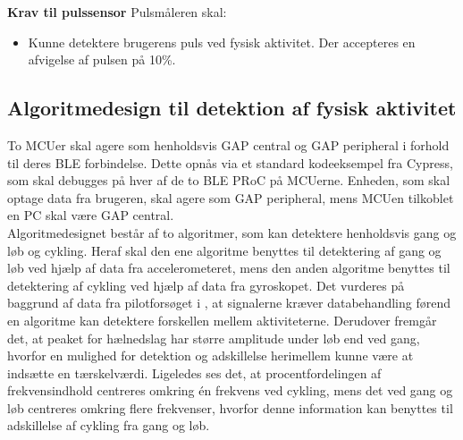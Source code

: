 \textbf{Krav til pulssensor} \newline
Pulsmåleren skal:
\begin{itemize}
\item Kunne detektere brugerens puls ved fysisk aktivitet. Der accepteres en afvigelse af pulsen på 10\%.
\end{itemize}
%

\subsection{Algoritmedesign til detektion af fysisk aktivitet} \label{krav_algoritme}
To MCUer skal agere som henholdsvis GAP central og GAP peripheral i forhold til deres BLE forbindelse. Dette opnås via et standard kodeeksempel fra Cypress, som skal debugges på hver af de to BLE PRoC på MCUerne. Enheden, som skal optage data fra brugeren, skal agere som GAP peripheral, mens MCUen tilkoblet en PC skal være GAP central. \\
Algoritmedesignet består af to algoritmer, som kan detektere henholdsvis gang og løb og cykling. Heraf skal den ene algoritme benyttes til detektering af gang og løb ved hjælp af data fra accelerometeret, mens den anden algoritme benyttes til detektering af cykling ved hjælp af data fra gyroskopet. Det vurderes på baggrund af data fra pilotforsøget i , at signalerne kræver databehandling førend en algoritme kan detektere forskellen mellem aktiviteterne. Derudover fremgår det, at peaket for hælnedslag har større amplitude under løb end ved gang, hvorfor en mulighed for detektion og adskillelse herimellem kunne være at indsætte en tærskelværdi. Ligeledes ses det, at procentfordelingen af frekvensindhold centreres omkring én frekvens ved cykling, mens det ved gang og løb centreres omkring flere frekvenser, hvorfor denne information kan benyttes til adskillelse af cykling fra gang og løb. 

